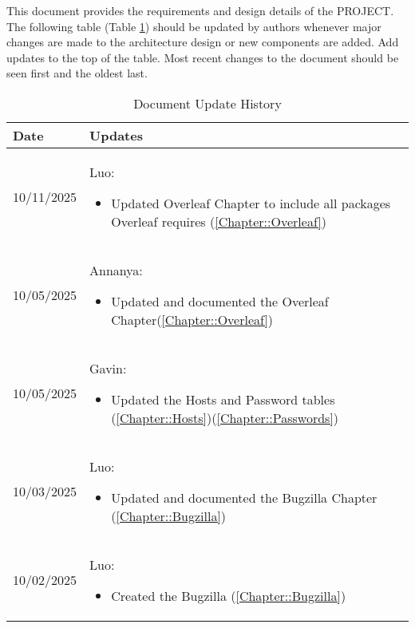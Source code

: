 This document provides the requirements and design details of the
PROJECT.  The following table (Table \ref{Table::UpdateHistory}) should be
updated by authors whenever major changes are made to the architecture
design or new components are added. Add updates to the top of the table.  
Most recent changes to the document should be seen first and the oldest 
last.

\begin{longtable}{|l||p{13.5cm}|}
\caption{Document Update History \label{Table::UpdateHistory}}\\
\hline
\textbf{Date} & \textbf{Updates} \\
\hline 
\endhead

10/11/2025 & Luo:
\begin{itemize}[topsep=0pt,itemsep=0pt,parsep=0pt,partopsep=0pt,leftmargin=12pt]
\item Updated Overleaf Chapter to include all packages Overleaf requires (\ref{Chapter::Overleaf})
\end{itemize} 
\\ \hline

10/05/2025 & Annanya:
\begin{itemize}[topsep=0pt,itemsep=0pt,parsep=0pt,partopsep=0pt,leftmargin=12pt]
\item Updated and documented the Overleaf Chapter(\ref{Chapter::Overleaf})
\end{itemize} 
\\ \hline

10/05/2025 & Gavin:
\begin{itemize}[topsep=0pt,itemsep=0pt,parsep=0pt,partopsep=0pt,leftmargin=12pt]
\item Updated the Hosts and Password tables (\ref{Chapter::Hosts})(\ref{Chapter::Passwords})
\end{itemize} 
\\ \hline

10/03/2025 & Luo:
\begin{itemize}[topsep=0pt,itemsep=0pt,parsep=0pt,partopsep=0pt,leftmargin=12pt]
\item Updated and documented the Bugzilla Chapter (\ref{Chapter::Bugzilla})
\end{itemize} 
\\ \hline

10/02/2025 & Luo:
\begin{itemize}[topsep=0pt,itemsep=0pt,parsep=0pt,partopsep=0pt,leftmargin=12pt]
\item Created the Bugzilla (\ref{Chapter::Bugzilla})
\end{itemize} 
\\ \hline


\end{longtable}
